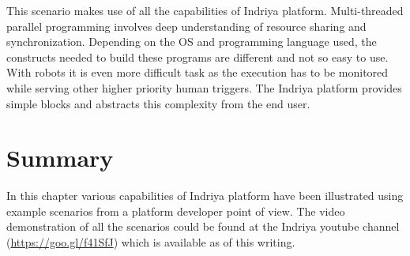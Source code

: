 This scenario makes use of all the capabilities of Indriya platform. Multi-threaded parallel programming involves deep understanding of resource sharing and synchronization. Depending on the OS and programming language used, the constructs needed to build these programs are different and not so easy to use. With robots it is even more difficult task as the execution has to be monitored while serving other higher priority human triggers. The Indriya platform provides simple blocks and abstracts this complexity from the end user.

\section{Summary}
In this chapter various capabilities of Indriya platform have been illustrated using example scenarios from a platform developer point of view. The video demonstration of all the scenarios could be found at the Indriya youtube channel (\url{https://goo.gl/f41SfJ}) which is available as of this writing.
